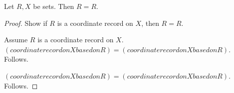 

\begin{proposition}\label{interface_does_not_escape_scope}
    Let $R,X$ be sets.
    Then $R=R$.
\end{proposition}
\begin{proof}
    Show if $R$ is a coordinate record on $X$, then $R=R$.
    \begin{subproof}
        Assume $R$ is a coordinate record on $X$.
        $(coordinate record on X based on R)=(coordinate record on X based on R)$.
        Follows.
    \end{subproof}
    $(coordinate record on X based on R)=(coordinate record on X based on R)$.
    Follows.
\end{proof}
